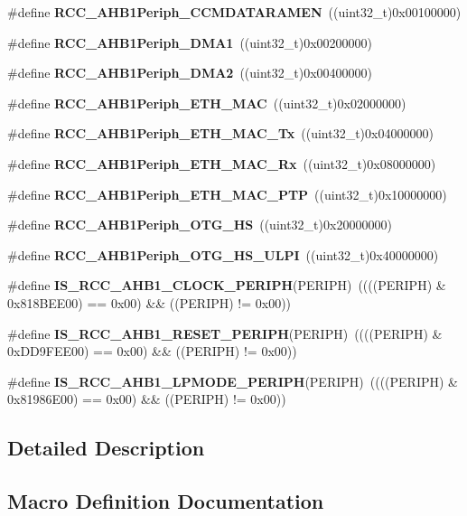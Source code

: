 \begin{DoxyCompactItemize}
\item 
\#define \textbf{ R\+C\+C\+\_\+\+A\+H\+B1\+Periph\+\_\+\+C\+C\+M\+D\+A\+T\+A\+R\+A\+M\+EN}~((uint32\+\_\+t)0x00100000)
\item 
\#define \textbf{ R\+C\+C\+\_\+\+A\+H\+B1\+Periph\+\_\+\+D\+M\+A1}~((uint32\+\_\+t)0x00200000)
\item 
\#define \textbf{ R\+C\+C\+\_\+\+A\+H\+B1\+Periph\+\_\+\+D\+M\+A2}~((uint32\+\_\+t)0x00400000)
\item 
\#define \textbf{ R\+C\+C\+\_\+\+A\+H\+B1\+Periph\+\_\+\+E\+T\+H\+\_\+\+M\+AC}~((uint32\+\_\+t)0x02000000)
\item 
\#define \textbf{ R\+C\+C\+\_\+\+A\+H\+B1\+Periph\+\_\+\+E\+T\+H\+\_\+\+M\+A\+C\+\_\+\+Tx}~((uint32\+\_\+t)0x04000000)
\item 
\#define \textbf{ R\+C\+C\+\_\+\+A\+H\+B1\+Periph\+\_\+\+E\+T\+H\+\_\+\+M\+A\+C\+\_\+\+Rx}~((uint32\+\_\+t)0x08000000)
\item 
\#define \textbf{ R\+C\+C\+\_\+\+A\+H\+B1\+Periph\+\_\+\+E\+T\+H\+\_\+\+M\+A\+C\+\_\+\+P\+TP}~((uint32\+\_\+t)0x10000000)
\item 
\#define \textbf{ R\+C\+C\+\_\+\+A\+H\+B1\+Periph\+\_\+\+O\+T\+G\+\_\+\+HS}~((uint32\+\_\+t)0x20000000)
\item 
\#define \textbf{ R\+C\+C\+\_\+\+A\+H\+B1\+Periph\+\_\+\+O\+T\+G\+\_\+\+H\+S\+\_\+\+U\+L\+PI}~((uint32\+\_\+t)0x40000000)
\item 
\#define \textbf{ I\+S\+\_\+\+R\+C\+C\+\_\+\+A\+H\+B1\+\_\+\+C\+L\+O\+C\+K\+\_\+\+P\+E\+R\+I\+PH}(P\+E\+R\+I\+PH)~((((P\+E\+R\+I\+PH) \& 0x818\+B\+E\+E00) == 0x00) \&\& ((\+P\+E\+R\+I\+P\+H) != 0x00))
\item 
\#define \textbf{ I\+S\+\_\+\+R\+C\+C\+\_\+\+A\+H\+B1\+\_\+\+R\+E\+S\+E\+T\+\_\+\+P\+E\+R\+I\+PH}(P\+E\+R\+I\+PH)~((((P\+E\+R\+I\+PH) \& 0x\+D\+D9\+F\+E\+E00) == 0x00) \&\& ((\+P\+E\+R\+I\+P\+H) != 0x00))
\item 
\#define \textbf{ I\+S\+\_\+\+R\+C\+C\+\_\+\+A\+H\+B1\+\_\+\+L\+P\+M\+O\+D\+E\+\_\+\+P\+E\+R\+I\+PH}(P\+E\+R\+I\+PH)~((((P\+E\+R\+I\+PH) \& 0x81986\+E00) == 0x00) \&\& ((\+P\+E\+R\+I\+P\+H) != 0x00))
\end{DoxyCompactItemize}


\subsection{Detailed Description}


\subsection{Macro Definition Documentation}
\mbox{\label{group__RCC__AHB1__Peripherals_ga647f5c8de61a77084d4d0e6bdd344601}} 
